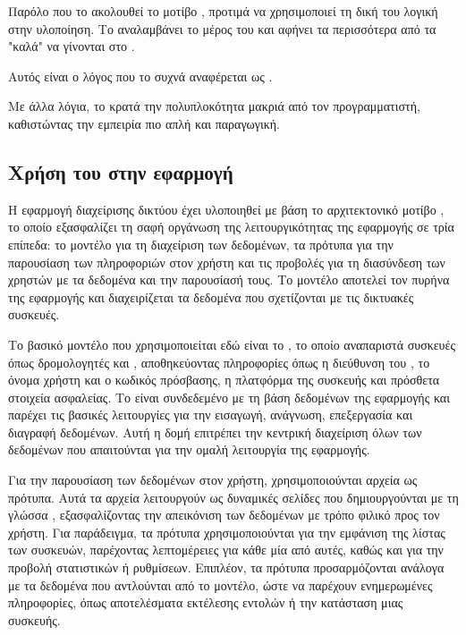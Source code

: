 Παρόλο που το  ακολουθεί το μοτίβο , προτιμά να χρησιμοποιεί τη δική του λογική στην υλοποίηση. Το  αναλαμβάνει το  
μέρος του  και αφήνει τα περισσότερα από τα "καλά" να γίνονται στο .

Αυτός είναι ο λόγος που το  συχνά αναφέρεται ως .




Με άλλα λόγια, το  κρατά την πολυπλοκότητα μακριά από τον προγραμματιστή, καθιστώντας την εμπειρία πιο απλή και παραγωγική.

\subsection{Χρήση του  στην εφαρμογή}

Η εφαρμογή διαχείρισης δικτύου έχει υλοποιηθεί με βάση το 
αρχιτεκτονικό μοτίβο , το οποίο 
εξασφαλίζει τη σαφή οργάνωση της λειτουργικότητας της εφαρμογής σε 
τρία επίπεδα: το μοντέλο για τη διαχείριση των δεδομένων, τα πρότυπα 
για την παρουσίαση των πληροφοριών στον χρήστη και τις προβολές για 
τη διασύνδεση των χρηστών με τα δεδομένα και την παρουσίασή τους.
Το μοντέλο αποτελεί τον πυρήνα της εφαρμογής και διαχειρίζεται τα 
δεδομένα που σχετίζονται με τις δικτυακές συσκευές. 

Το βασικό μοντέλο που χρησιμοποιείται εδώ είναι το , 
το οποίο αναπαριστά συσκευές όπως δρομολογητές και , 
αποθηκεύοντας πληροφορίες όπως η διεύθυνση του , το όνομα 
χρήστη και ο κωδικός πρόσβασης, η πλατφόρμα της συσκευής 
και πρόσθετα στοιχεία ασφαλείας. Το  είναι συνδεδεμένο με 
τη βάση δεδομένων της εφαρμογής και παρέχει τις βασικές λειτουργίες 
για την εισαγωγή, ανάγνωση, επεξεργασία και διαγραφή δεδομένων. 
Αυτή η δομή επιτρέπει την κεντρική διαχείριση όλων των δεδομένων που 
απαιτούνται για την ομαλή λειτουργία της εφαρμογής.

Για την παρουσίαση των δεδομένων στον χρήστη, χρησιμοποιούνται αρχεία 
 ως πρότυπα. Αυτά τα αρχεία λειτουργούν ως δυναμικές σελίδες 
που δημιουργούνται με τη γλώσσα , εξασφαλίζοντας 
την απεικόνιση των δεδομένων με τρόπο φιλικό προς τον χρήστη. 
Για παράδειγμα, τα πρότυπα χρησιμοποιούνται για την εμφάνιση της λίστας των συσκευών, παρέχοντας λεπτομέρειες για κάθε μία από αυτές, καθώς και για την προβολή στατιστικών ή ρυθμίσεων. Επιπλέον, τα πρότυπα προσαρμόζονται ανάλογα με τα δεδομένα που αντλούνται από το μοντέλο, ώστε να παρέχουν ενημερωμένες πληροφορίες, όπως αποτελέσματα εκτέλεσης εντολών ή την κατάσταση μιας συσκευής.

